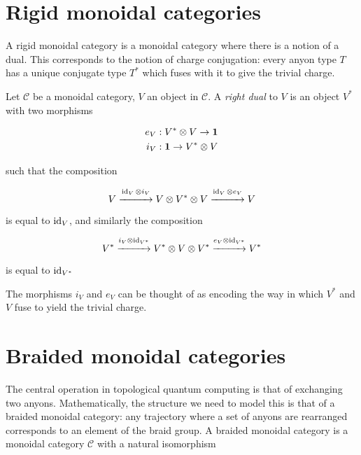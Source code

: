\section{Rigid monoidal categories}

A rigid monoidal category is a monoidal category where there is a notion of a
dual. This corresponds to the notion of charge conjugation: every anyon type
$T$ has a unique conjugate type $T^*$ which fuses with it to give the trivial
charge.

\begin{defn}
    Let $\mathcal{C}$ be a monoidal category, $V$ an object in $\mathcal{C}$. A
    \emph{right dual} to $V$ is an object $V^*$ with two morphisms

    \begin{align}
        e_V: V^* \otimes V \to \mathbf{1}  \\
        i_V: \mathbf{1} \to V^* \otimes V
    \end{align}
\end{defn}

such that the composition

\begin{equation}
    V \stackrel{ \operatorname{id}_V \otimes i_V }{\xrightarrow{\hspace*{1cm}}} V \otimes V^*
    \otimes V  \stackrel{\operatorname{id}_V \otimes e_V}{\xrightarrow{\hspace*{1cm}}} V
\end{equation}

is equal to $\operatorname{id}_V$, and similarly the composition

\begin{equation}
    V^* \stackrel{i_V \otimes \operatorname{id}_{V^*} }{\xrightarrow{\hspace*{1cm}}} V^*
    \otimes V \otimes V^*  \stackrel{e_V \otimes
    \operatorname{id}_{V^*}}{\xrightarrow{\hspace*{1cm}}} V^*
\end{equation}

is equal to $\operatorname{id}_{V^*}$

The morphisms $i_V$ and $e_V$ can be thought of as encoding the way in which
$V^*$ and $V$ fuse to yield the trivial charge.
   
\section{Braided monoidal categories}
\label{section:Braiding}

The central operation in topological quantum computing is that of exchanging
two anyons. Mathematically, the structure we need to model this is that of a
braided monoidal category: any trajectory where a set of anyons are rearranged
corresponds to
an element of the braid group. A braided monoidal category is a monoidal
category $\mathcal{C}$ with a natural isomorphism

